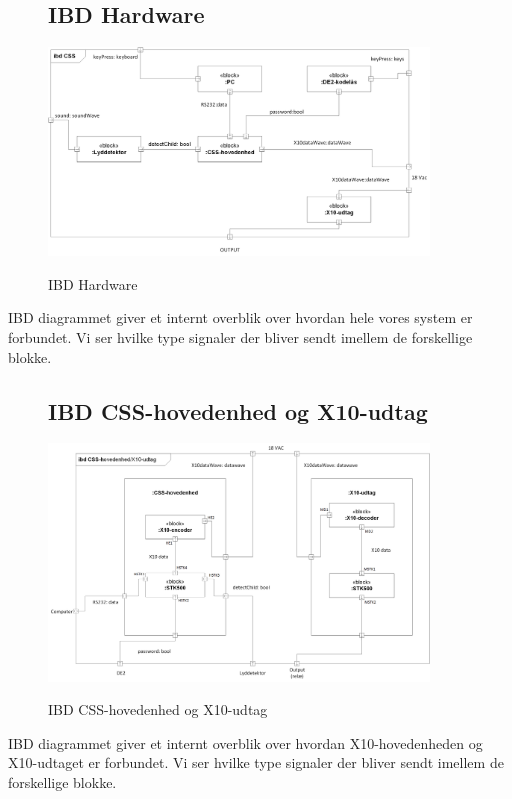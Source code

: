 \begin{figure}[H] \centering
\subsection{IBD Hardware}
{\includegraphics[width=0.9\textwidth]{billeder/diagrammer/IBD_Hardware}}
\caption{IBD Hardware}
\label{lab:ibdhardware}
\raggedright
\end{figure}
IBD diagrammet giver et internt overblik over hvordan hele vores system er forbundet. Vi ser hvilke type signaler der bliver sendt imellem de forskellige blokke.

\begin{figure}[H] \centering
\subsection{IBD CSS-hovedenhed og X10-udtag}
{\includegraphics[width=0.9\textwidth]{billeder/diagrammer/IBD_Hovedenhed_Modtager}}
\caption{IBD CSS-hovedenhed og X10-udtag}
\label{lab:ibdhovedenhedmodtager}
\raggedright
\end{figure}
IBD diagrammet giver et internt overblik over hvordan X10-hovedenheden og X10-udtaget er forbundet. Vi ser hvilke type signaler der bliver sendt imellem de forskellige blokke.


